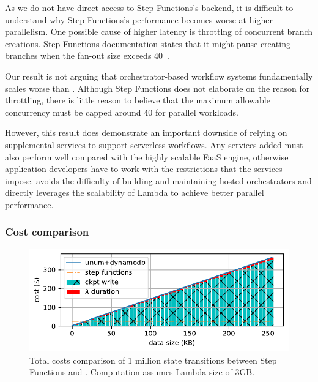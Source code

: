 As we do not have direct access to Step Functions's backend, it is difficult to
understand why Step Functions's performance becomes worse at higher parallelism. One
possible cause of higher latency is throttlng of concurrent branch creations.
Step Functions documentation states that it might pause creating branches when the
fan-out size exceeds 40~\cite{aws-step-functions-map-state}.

Our result is not arguing that orchestrator-based workflow systems
fundamentally scales worse than \name{}. Although Step Functions does not
elaborate on the reason for throttling, there is little reason to believe that
the maximum allowable concurrency must be capped around 40 for parallel
workloads.

However, this result does demonstrate an important downside of relying on
supplemental services to support serverless workflows. Any services added must
also perform well compared with the highly scalable FaaS engine, otherwise
application developers have to work with the restrictions that the services
impose. \name{} avoids the difficulty of building and maintaining hosted
orchestrators and directly leverages the scalability of Lambda to achieve
better parallel performance.

\subsubsection{Cost comparison}

\begin{figure}[t!]
    \centering
    \includegraphics[width=\columnwidth]{figures/TotalCost.pdf}
    \caption{Total costs comparison of 1 million state transitions between
    Step Functions and \name{}. Computation assumes Lambda size of 3GB.}
    \label{fig:total-costs-single}
\end{figure}

